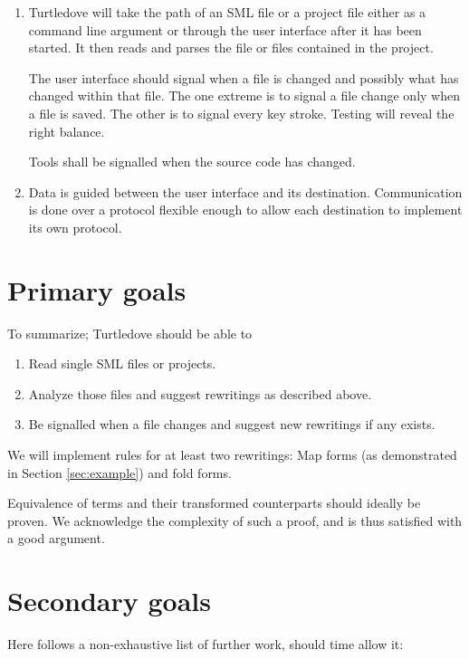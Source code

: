 \documentclass[a4paper,oneside,final]{article}
\begin{document}
\begin{enumerate}
\item Turtledove will take the path of an SML file or a project file either as a
  command line argument or through the user interface after it has been
  started. It then reads and parses the file or files contained in the project.

  The user interface should signal when a file is changed and possibly what has
  changed within that file. The one extreme is to signal a file change only when
  a file is saved. The other is to signal every key stroke. Testing will reveal
  the right balance.

  Tools shall be signalled when the source code has changed.

\item Data is guided between the user interface and its
  destination. Communication is done over a protocol flexible enough to allow
  each destination to implement its own protocol.
\end{enumerate}

\section{Primary goals}
To summarize; Turtledove should be able to

\begin{enumerate}
\item Read single SML files or projects.
\item Analyze those files and suggest rewritings as described above.
\item Be signalled when a file changes and suggest new rewritings if any exists.
\end{enumerate}

We will implement rules for at least two rewritings: Map forms (as demonstrated
in Section \ref{sec:example}) and fold forms.

Equivalence of terms and their transformed counterparts should ideally be
proven. We acknowledge the complexity of such a proof, and is thus satisfied
with a good argument.

\section{Secondary goals}
Here follows a non-exhaustive list of further work, should time allow it:
\end{document}
